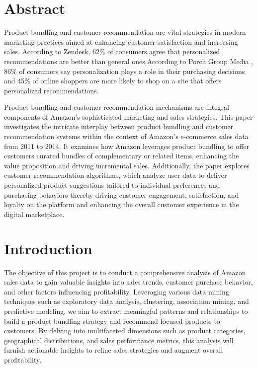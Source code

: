 \documentclass[11pt]{article} %
\begin{document}
\section{Abstract}
Product bundling and customer recommendation are vital strategies in modern marketing practices aimed at enhancing customer satisfaction and increasing sales. According to Zendesk\cite{7}, 62\% of consumers agree that personalized recommendations are better than general ones.According to Porch Group Media \cite{8}, 86\% of consumers say personalization plays a role in their purchasing decisions and 45\% of online shoppers are more likely to shop on a site that offers personalized recommendations.

Product bundling and customer recommendation mechanisms are integral components of Amazon's sophisticated marketing and sales strategies. This paper investigates the intricate interplay between product bundling and customer recommendation systems within the context of Amazon's e-commerce sales data from 2011 to 2014. It examines how Amazon leverages product bundling to offer customers curated bundles of complementary or related items, enhancing the value proposition and driving incremental sales. Additionally, the paper explores customer recommendation algorithms, which analyze user data to deliver personalized product suggestions tailored to individual preferences and purchasing behaviors thereby driving customer engagement, satisfaction, and loyalty on the platform and enhancing the overall customer experience in the digital marketplace.
\section{Introduction}
The objective of this project is to conduct a comprehensive analysis of Amazon sales data to gain valuable insights into sales trends, customer purchase behavior, and other factors influencing profitability. Leveraging various data mining techniques such as exploratory data analysis, clustering, association mining, and predictive modeling, we aim to extract meaningful patterns and relationships to build a product bundling strategy and recommend focused products to customers. By delving into multifaceted dimensions such as product categories, geographical distributions, and sales performance metrics, this analysis will furnish actionable insights to refine sales strategies and augment overall profitability.
\end{document}
